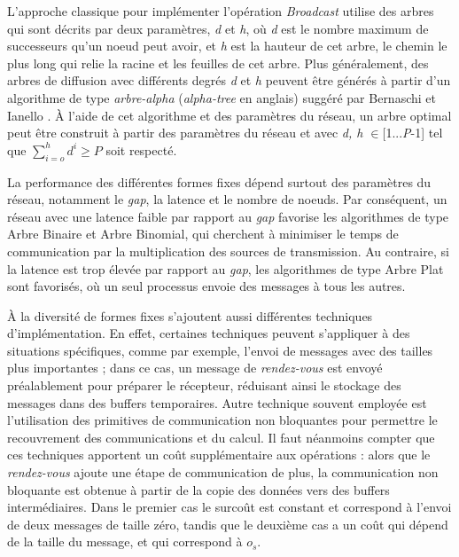 L'approche classique pour implémenter l'opération \emph{Broadcast} utilise
des arbres qui sont décrits par deux paramètres, \emph{d} et \emph{h},
où \emph{d} est le nombre maximum de successeurs qu'un noeud peut
avoir, et \emph{h} est la hauteur de cet arbre, le chemin le plus
long qui relie la racine et les feuilles de cet arbre. Plus généralement,
des arbres de diffusion avec différents degrés \emph{d} et \emph{h}
peuvent être générés à partir d'un algorithme de type \emph{arbre-alpha}
(\emph{alpha-tree} en anglais) suggéré par Bernaschi et Ianello \cite{Bernaschi98}.
À l'aide de cet algorithme et des paramètres du réseau, un arbre optimal
peut être construit à partir des paramètres du réseau et avec \emph{d,
	h $\in$}{[}1...\emph{P}-1] tel que $\sum_{i=o}^{h}d^{i}\geq P$ soit
respecté. %

La performance des différentes formes fixes dépend surtout des paramètres
du réseau, notamment le \emph{gap}, la latence et le nombre de noeuds.
Par conséquent, un réseau avec une latence faible par rapport au \emph{gap}
favorise les algorithmes de type Arbre Binaire et Arbre Binomial,
qui cherchent à minimiser le temps de communication par la multiplication
des sources de transmission. Au contraire, si la latence est trop
élevée par rapport au \emph{gap}, les algorithmes de type Arbre Plat
sont favorisés, où un seul processus envoie des messages à tous les
autres. 


À la diversité de formes fixes s'ajoutent aussi différentes techniques
d'implémentation. En effet, certaines techniques peuvent s'appliquer
à des situations spécifiques, comme par exemple, l'envoi de messages
avec des tailles plus importantes ; dans ce cas, un message de \emph{rendez-vous} est
envoyé préalablement pour préparer le récepteur, réduisant ainsi le
stockage des messages dans des buffers temporaires. Autre technique
souvent employée est l'utilisation des primitives de communication
non bloquantes pour permettre le recouvrement des communications et
du calcul. Il faut néanmoins compter que ces techniques apportent
un coût supplémentaire aux opérations : alors que le \emph{rendez-vous}
ajoute une étape de communication de plus, la communication non bloquante
est obtenue à partir de la copie des données vers des buffers intermédiaires.
Dans le premier cas le surcoût est constant et correspond à l'envoi
de deux messages de taille zéro, tandis que le deuxième cas a un coût
qui dépend de la taille du message, et qui correspond à $o_{s}$.

